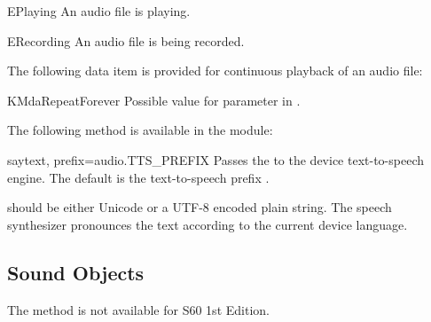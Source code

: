 \begin{datadesc}{EPlaying} 
An audio file is playing.
\end{datadesc}

\begin{datadesc}{ERecording}
An audio file is being recorded.
\end{datadesc}

The following data item is provided for continuous playback of an audio file:

\begin{datadesc}{KMdaRepeatForever}
Possible value for  parameter in .
\end{datadesc}

The following method is available in the  module:

\begin{funcdesc}{say}{text, prefix=audio.TTS_PREFIX}
Passes the  to the device text-to-speech engine. The default 
 is the text-to-speech prefix . 

 should be either Unicode or a UTF-8 encoded plain
string. The speech synthesizer pronounces the text according to the
current device language.
\end{funcdesc}

\subsection{Sound Objects}
\label{subsec:sound}

\begin{notice}[note]
The method  is not available for S60 1st 
Edition.
\end{notice}

